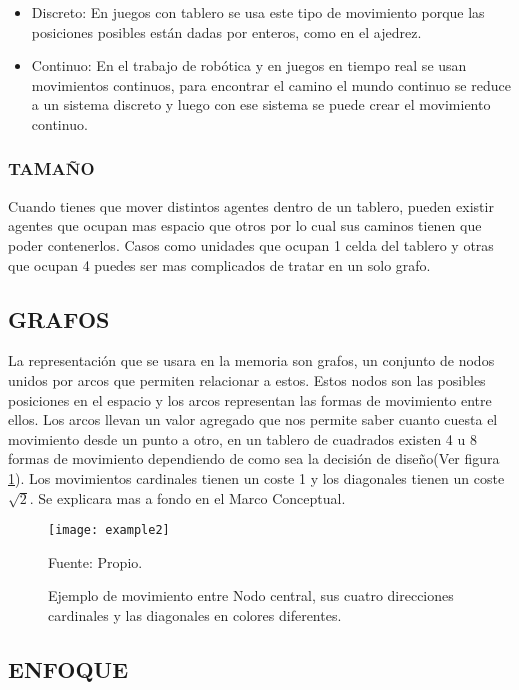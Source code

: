 \begin{itemize}
    \item Discreto: En juegos con tablero se usa este tipo de movimiento porque las posiciones posibles están dadas por enteros, como en el ajedrez.
    
    \item Continuo: En el trabajo de robótica y en juegos en tiempo real se usan movimientos continuos, para encontrar el camino el mundo continuo se reduce a un sistema discreto y luego con ese sistema se puede crear el movimiento continuo.
\end{itemize}

\subsubsection{TAMAÑO}

Cuando tienes que mover distintos agentes dentro de un tablero, pueden existir agentes que ocupan mas espacio que otros por lo cual sus caminos tienen que poder contenerlos. Casos como unidades que ocupan 1 celda del tablero y otras que ocupan 4 puedes ser mas complicados de tratar en un solo grafo.


\subsection{GRAFOS}

La representación que se usara en la memoria son grafos, un conjunto de nodos unidos por arcos que permiten relacionar a estos. Estos nodos son las posibles posiciones en el espacio y los arcos representan las formas de movimiento entre ellos.
Los arcos llevan un valor agregado que nos permite saber cuanto cuesta el movimiento desde un punto a otro, en un tablero de cuadrados existen 4 u 8 formas de movimiento dependiendo de como sea la decisión de diseño(Ver figura \ref{fig:example2}). Los movimientos cardinales tienen un coste 1 y los diagonales tienen un coste $ \sqrt{2} $.
Se explicara mas a fondo en el Marco Conceptual.


\begin{figure}[h]
\centering
\texttt{[image: example2]}
\caption{\label{fig:example2} Ejemplo de movimiento entre Nodo central, sus cuatro direcciones cardinales y las diagonales en colores diferentes.} Fuente: Propio.
\end{figure}

\subsection{ENFOQUE}

